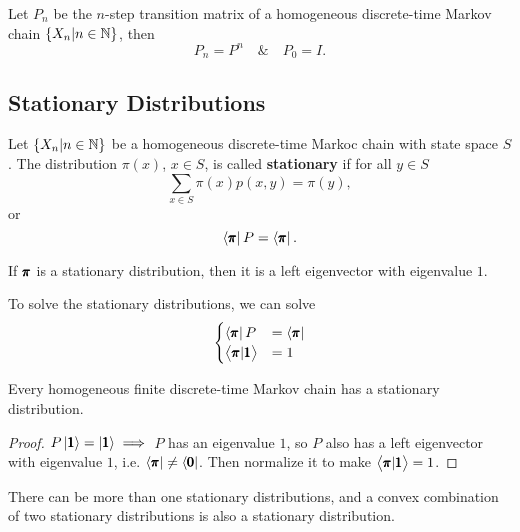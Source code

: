 \begin{corollary}
    Let $P_n$ be the $n$-step transition matrix of a homogeneous discrete-time Markov chain $\{X_n | n \in \mathbb{N}\}$, then 
    \begin{equation*}
        P_n = P^n \quad \& \quad P_0 = I.
    \end{equation*}
\end{corollary}

\subsection{Stationary Distributions}

\begin{definition}[Stationarity]
    Let $\{ X_n | n \in \mathbb{N} \}$ be a homogeneous discrete-time Markoc chain with state space $S$. The distribution $\pi(x)$, $x \in S$, is called \textbf{stationary} if for all $y \in S$
    \begin{equation*}
        \sum_{x \in S} \pi(x) p(x,y) = \pi(y),
    \end{equation*}
    or 
    \begin{equation*}
        \left< \pmb{\pi} \right| P = \left< \pmb{\pi} \right|.
    \end{equation*}
\end{definition}

\begin{remark}
    If $\pmb{\pi}$ is a stationary distribution, then it is a left eigenvector with eigenvalue $1$.
\end{remark}

\begin{remark}
    To solve the stationary distributions, we can solve 
    \begin{equation*}
        \begin{cases}
            \left< \pmb{\pi} \right| P & = \left< \pmb{\pi} \right| \\ 
            \left< \pmb{\pi} | \pmb{1} \right > & = 1
        \end{cases}
    \end{equation*}
\end{remark}

\begin{theorem}
    Every homogeneous finite discrete-time Markov chain has a stationary distribution.
\end{theorem}
\begin{proof}
    $P \left| \pmb{1} \right> = \left| \pmb{1} \right> \implies$ $P$ has an eigenvalue $1$, so $P$ also has a left eigenvector with eigenvalue $1$, i.e. $\left< \pmb{\pi} \right| \neq \left< \pmb{0} \right|$. Then normalize it to make $\left< \pmb{\pi} | \pmb{1} \right> = 1$.
\end{proof}

\begin{remark}
    There can be more than one stationary distributions, and a convex combination of two stationary distributions is also a stationary distribution.
\end{remark}
